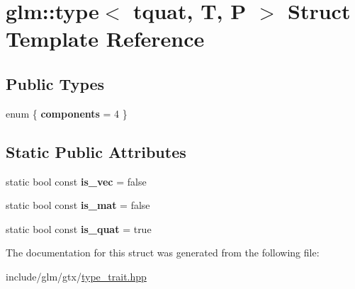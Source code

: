 \hypertarget{structglm_1_1type_3_01tquat_00_01T_00_01P_01_4}{}\section{glm\+:\+:type$<$ tquat, T, P $>$ Struct Template Reference}
\label{structglm_1_1type_3_01tquat_00_01T_00_01P_01_4}
\subsection*{Public Types}
\begin{DoxyCompactItemize}
\item 
\mbox{\label{structglm_1_1type_3_01tquat_00_01T_00_01P_01_4_a3023087a01c93465bd3260dd489c4fc3}} 
enum \{ {\bfseries components} = 4
 \}
\end{DoxyCompactItemize}
\subsection*{Static Public Attributes}
\begin{DoxyCompactItemize}
\item 
\mbox{\label{structglm_1_1type_3_01tquat_00_01T_00_01P_01_4_abfe7f7955372e6397a73ada47415aa56}} 
static bool const {\bfseries is\+\_\+vec} = false
\item 
\mbox{\label{structglm_1_1type_3_01tquat_00_01T_00_01P_01_4_a114d99ae019bf324d1b690b045ecbb36}} 
static bool const {\bfseries is\+\_\+mat} = false
\item 
\mbox{\label{structglm_1_1type_3_01tquat_00_01T_00_01P_01_4_a2ba7c2222a48ffb612b8617ded2e3d62}} 
static bool const {\bfseries is\+\_\+quat} = true
\end{DoxyCompactItemize}


The documentation for this struct was generated from the following file\+:\begin{DoxyCompactItemize}
\item 
include/glm/gtx/\hyperlink{type__trait_8hpp}{type\+\_\+trait.\+hpp}\end{DoxyCompactItemize}
